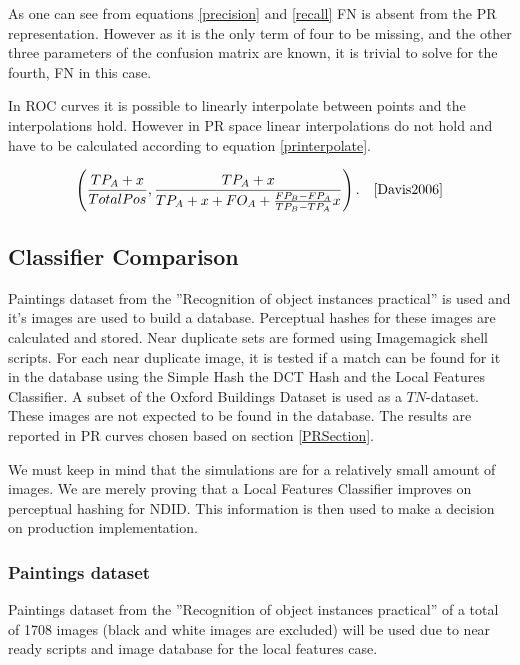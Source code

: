 \documentclass[english,12pt,a4paper,pdftex,elec,utf8]{aaltothesis}
\begin{document}
As one can see from equations \ref{precision} and \ref{recall} FN is absent from the PR representation. However as it is the only term of four to be missing, and the other three parameters of the confusion matrix are known, it is trivial to solve for the fourth, FN in this case. \cite{Davis2006}

In ROC curves it is possible to linearly interpolate between points and the interpolations hold. However in PR space linear interpolations do not hold and have to be calculated according to equation \ref{printerpolate}. \cite{Davis2006}

\begin{equation}\label{printerpolate}
\left(\frac{TP_A+x}{Total Pos}, \frac{TP_A+x}{TP_A+x+FO_A+ \frac{FP_B-FP_A}{TP_B-TP_A}x} \right). \quad \cite{Davis2006}
\end{equation}


\subsection{Classifier Comparison}
Paintings dataset from the ''Recognition of object instances practical'' \cite{Vedaldi2012} is used and it's images are used to build a database. Perceptual hashes for these images are calculated and stored. Near duplicate sets are formed using Imagemagick shell scripts. For each near duplicate image, it is tested if a match can be found for it in the database using the Simple Hash the DCT Hash and the Local Features Classifier. A subset of the Oxford Buildings Dataset \cite{PhilbinJamesArandjelovicReljaZisserman2012} is used as a $TN$-dataset. These images are not expected to be found in the database. The results are reported in PR curves chosen based on section \ref{PRSection}.

We must keep in mind that the simulations are for a relatively small amount of images. We are merely proving that a Local Features Classifier improves on perceptual hashing for NDID. This information is then used to make a decision on production implementation.

\subsubsection{Paintings dataset}
Paintings dataset from the ''Recognition of object instances practical'' \cite{Vedaldi2012} of a total of 1708 images (black and white images are excluded) will be used due to near ready scripts and image database for the local features case.
\end{document}
